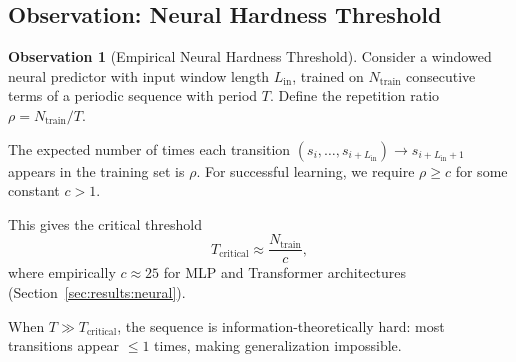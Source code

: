 \documentclass[11pt]{article}
\theoremstyle{plain}
\theoremstyle{definition}
\newtheorem{observation}[theorem]{Observation}
\begin{document}
\subsection{Observation: Neural Hardness Threshold}

\begin{observation}[Empirical Neural Hardness Threshold]
\label{obs:neural}
Consider a windowed neural predictor with input window length $L_{\mathrm{in}}$, trained on $N_{\mathrm{train}}$ consecutive terms of a periodic sequence with period $T$. Define the repetition ratio $\rho = N_{\mathrm{train}}/T$.

The expected number of times each transition $(s_i, \ldots, s_{i+L_{\mathrm{in}}}) \to s_{i+L_{\mathrm{in}}+1}$ appears in the training set is $\rho$. For successful learning, we require $\rho \geq c$ for some constant $c > 1$.

This gives the critical threshold
\begin{equation}
  T_{\mathrm{critical}} \approx \frac{N_{\mathrm{train}}}{c},
\end{equation}
where empirically $c \approx 25$ for MLP and Transformer architectures (Section~\ref{sec:results:neural}).

When $T \gg T_{\mathrm{critical}}$, the sequence is information-theoretically hard: most transitions appear $\leq 1$ times, making generalization impossible.
\end{observation}
\end{document}
